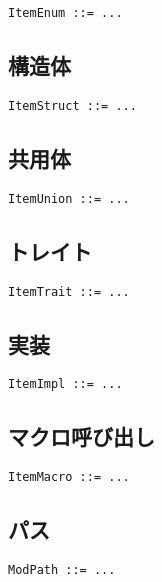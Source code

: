 \documentclass[dvipdfmx,uplatex,papersize,a4paper,10pt]{jsbook}
\theoremstyle{definition}
\begin{document}
\begin{lstlisting}[language=BNFLike, gobble=2]
  ItemEnum ::= ...
\end{lstlisting}

\subsection{構造体}

\begin{lstlisting}[language=BNFLike, gobble=2]
  ItemStruct ::= ...
\end{lstlisting}

\subsection{共用体}

\begin{lstlisting}[language=BNFLike, gobble=2]
  ItemUnion ::= ...
\end{lstlisting}

\subsection{トレイト}

\begin{lstlisting}[language=BNFLike, gobble=2]
  ItemTrait ::= ...
\end{lstlisting}

\subsection{実装}

\begin{lstlisting}[language=BNFLike, gobble=2]
  ItemImpl ::= ...
\end{lstlisting}

\subsection{マクロ呼び出し}

\begin{lstlisting}[language=BNFLike, gobble=2]
  ItemMacro ::= ...
\end{lstlisting}

\subsection{パス}

\begin{lstlisting}[language=BNFLike, gobble=2]
  ModPath ::= ...
\end{lstlisting}
\end{document}
